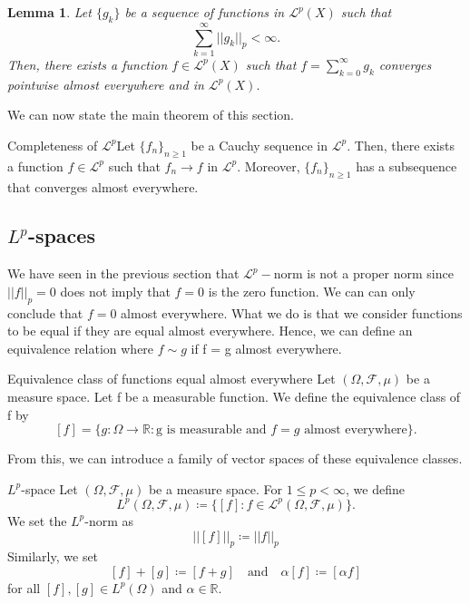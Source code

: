 \documentclass[twoside]{article}
\newtheorem{lemma}[theorem]{Lemma}
\newcommand{\sigmalgebra}{\mathcal{F}}
\begin{document}
\begin{lemma}Let $\{g_k\}$ be a sequence of functions in $\mathcal{L}^p(X)$ such that 
$$
\sum_{k=1}^{\infty}||g_k||_p < \infty.
$$
Then, there exists a function $f \in \mathcal{L}^p(X)$ such that $f = \sum_{k=0}^{\infty}g_k$ converges pointwise almost everywhere and in $\mathcal{L}^p(X).$
\end{lemma}

We can now state the main theorem of this section.
\begin{theorem_exam}{Completeness of $\mathcal{L}^p$}{}Let $\{f_n\}_{n \geq 1}$ be a Cauchy sequence in $\mathcal{L}^p.$ Then, there exists a function $f \in \mathcal{L}^p$ such that $f_n \rightarrow f$ in $\mathcal{L}^p.$ Moreover, $\{f_n\}_{n \geq 1}$ has a subsequence that converges almost everywhere.
\end{theorem_exam}

\newpage
\subsection{$L^p$-spaces}

We have seen in the previous section that $\mathcal{L}^p-$norm is not a proper norm since $||f||_p = 0$ does not imply that $f = 0$ is the zero function. We can can only conclude that $f = 0$ almost everywhere. What we do is that we consider functions to be equal if they are equal almost everywhere. Hence, we can define an equivalence relation where $f \sim g$ if f = g almost everywhere.

\begin{definition_exam}{Equivalence class of functions equal almost everywhere}{} Let $(\Omega, \sigmalgebra, \mu)$ be a measure space. Let f be a measurable function. We define the equivalence class of f by 
$$
[f] = \{g: \Omega \rightarrow \mathbb{R}: \text{g is measurable and } f = g \text{ almost everywhere}\}.
$$
\end{definition_exam}


From this, we can introduce a family of vector spaces of these equivalence classes. 

\begin{definition_exam}{$L^p$-space}{} Let $(\Omega, \sigmalgebra, \mu)$ be a measure space. For $1 \leq p < \infty$, we define 
$$
L^p(\Omega, \sigmalgebra, \mu) \coloneqq \{[f]: f \in \mathcal{L}^p(\Omega,\sigmalgebra,\mu)\}.
$$
We set the $L^p$-norm as 
$$
\bigg|\bigg| [f]\bigg|\bigg|_p \coloneqq ||f||_p
$$
Similarly, we set 
$$
[f] + [g] \coloneqq [f + g] \quad \text{and} \quad \alpha[f] \coloneqq [\alpha f]
$$
for all $[f], [g] \in L^p(\Omega)$ and $\alpha \in \mathbb{R}.$
\end{definition_exam}
\end{document}
